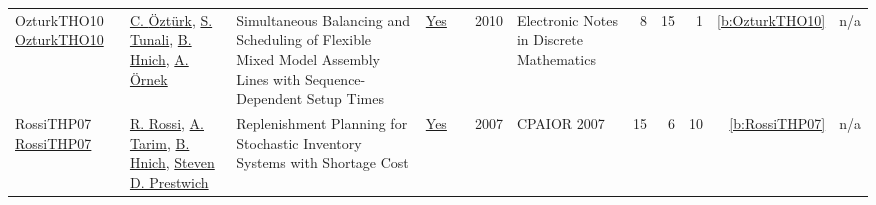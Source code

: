 {\begin{longtable}{>{\raggedright\arraybackslash}p{3cm}>{\raggedright\arraybackslash}p{6cm}>{\raggedright\arraybackslash}p{6.5cm}rrrp{2.5cm}rrrrr}
OzturkTHO10 \href{https://www.sciencedirect.com/science/article/pii/S1571065310000107}{OzturkTHO10} & \hyperref[auth:a136]{C. {\"{O}}zt{\"{u}}rk}, \hyperref[auth:a137]{S. Tunali}, \hyperref[auth:a138]{B. Hnich}, \hyperref[auth:a139]{A. {\"{O}}rnek} & Simultaneous Balancing and Scheduling of Flexible Mixed Model Assembly Lines with Sequence-Dependent Setup Times & \href{../works/OzturkTHO10.pdf}{Yes} & \cite{OzturkTHO10} & 2010 & Electronic Notes in Discrete Mathematics & 8 & 15 & 1 & \ref{b:OzturkTHO10} & n/a\\
RossiTHP07 \href{https://doi.org/10.1007/978-3-540-72397-4_17}{RossiTHP07} & \hyperref[auth:a372]{R. Rossi}, \hyperref[auth:a373]{A. Tarim}, \hyperref[auth:a138]{B. Hnich}, \hyperref[auth:a374]{Steven D. Prestwich} & Replenishment Planning for Stochastic Inventory Systems with Shortage Cost & \href{../works/RossiTHP07.pdf}{Yes} & \cite{RossiTHP07} & 2007 & CPAIOR 2007 & 15 & 6 & 10 & \ref{b:RossiTHP07} & n/a\\
\end{longtable}
}

\clearpage

